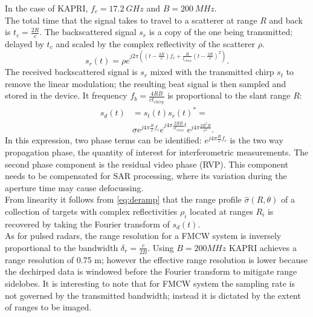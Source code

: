In the case of KAPRI, $f_c= 17.2~GHz$ and $B=200~MHz$.\\
The total time that the signal takes to travel to a scatterer at range $R$ and back is $t_{c} = \frac{2 R}{c}$. The backscattered signal $s_r$ is a copy of the one being transmitted; delayed by $t_{c}$ and scaled by the complex reflectivity of the scatterer $\rho$.
\begin{equation}
		s_r\left(t\right) = \rho e^{j 2 \pi \left( \left(t - \frac{2 R}{c}\right) f_{c} +  \frac{B}{t_{chirp}} \left(t - \frac{2 R}{c}\right)^2 \right)}.
\end{equation}
The received backscattered signal is $s_r$  mixed with the transmitted chirp $s_t$  to remove the linear modulation; the resulting beat signal is then sampled and stored in the device. It frequency $f_{b} = \frac{4 R B}{c t_{chirp}}$ is proportional to the slant range $R$:
\begin{equation}\label{eq:deramp}
	\begin{aligned}
	s_{d}\left(t\right) &=s_t\left(t\right)s_r\left(t\right)^* =\\ 
	&\sigma e^{j 4 \pi \frac{ R}{c}f_c}  e^{j 4 \pi \frac{2 R B }{c t_{chirp}} t}  e^{j 4 \pi \frac{2 R^2 B}{c^2}}.
	\end{aligned}
\end{equation} 
In this expression, two phase terms can be identified: $ e^{j 4 \pi \frac{R}{c}f_c}$ is the two way propagation phase, the quantity of interest for  interferometric measurements. The second phase component is the residual video phase (RVP). This component needs to be compensated for SAR processing, where its variation during the aperture time may cause defocussing.\\
From  linearity it follows from \autoref{eq:deramp} that the range profile $\hat{\sigma}\left(R, \theta\right)$ of a collection of targets with complex reflectivities $\rho_i$ located at ranges $R_{i}$ is recovered by taking the Fourier transform of $s_{d}\left(t\right)$.\\
As for pulsed radars, the range resolution  for a FMCW system is inversely proportional to the bandwidth $\delta_{r} = \frac{c}{2 B}$. Using $B=200 MHz$ KAPRI achieves a range resolution of 0.75 m\cite{Strozzi2011}; however the effective range resolution is lower because the dechirped data is windowed before the Fourier transform to mitigate range sidelobes. It is interesting to note that for FMCW system the sampling rate is not governed by the transmitted bandwidth; instead it is dictated by the extent of ranges to be imaged\cite{Meta2006}.\\
